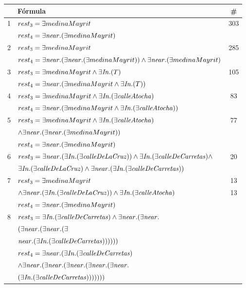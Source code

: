 \label{formulas-plurales}
\begin{table}[H]
\begin{center}
\begin{tabular}{|l|l|c|}
\hline
&F\'ormula			      &  \# \\ \hline \hline

1&$rest_3 = \exists medinaMayrit$ &303\\
 &$rest_4 = \exists \mathit{near}.(\exists medinaMayrit)$& \\ \hline

2&$rest_3 = \exists medinaMayrit$ & 285\\  
 &$rest_4 =  \exists \mathit{near}. (\exists \mathit{near}.(\exists medinaMayrit)) \land \exists \mathit{near}.(\exists medinaMayrit)$& \\ \hline

3&$rest_3 =\exists medinaMayrit \land \exists \mathit{In}.(T)$ & 105\\ 
 &$rest_4 =\exists \mathit{near}.(\exists medinaMayrit \land \exists \mathit{In}.(T))$& \\ \hline

4&$rest_3 =\exists medinaMayrit \land \exists \mathit{In}.(\exists \mathit{calleAtocha})$ &83 \\ 
 &$rest_4 =\exists \mathit{near}.(\exists medinaMayrit  \land \exists \mathit{In}.(\exists \mathit{calleAtocha}))$& \\ \hline

5&$rest_3 =\exists medinaMayrit  \land \exists \mathit{In}.(\exists \mathit{calleAtocha})$&77 \\ 
 &$\land \exists \mathit{near}.(\exists \mathit{near}.(\exists medinaMayrit))$& \\
&$rest_4 = \exists \mathit{near}.(\exists medinaMayrit)$& \\ \hline

6&$rest_3 =\exists \mathit{near}.(\exists \mathit{In}.(\exists \mathit{calleDeLaCruz}))  \land \exists \mathit{In}.(\exists \mathit{calleDeCarretas}) \land $ & 20\\
&$\exists \mathit{In}.(\exists \mathit{calleDeLaCruz})  \land \exists \mathit{near}.(\exists \mathit{In}.(\exists \mathit{calleDeCarretas}))$& \\ \hline

7&$rest_3 =\exists medinaMayrit  $&13 \\ 
&$\land \exists \mathit{near}.(\exists \mathit{In}.(\exists \mathit{calleDeLaCruz}))  \land \exists \mathit{In}.(\exists \mathit{calleAtocha})$ & 13\\
&$rest_4 = \exists \mathit{near}.(\exists medinaMayrit)$&\\ \hline

8&$rest_3 =\exists \mathit{In}.(\exists \mathit{calleDeCarretas})  \land \exists \mathit{near}.(\exists \mathit{near}.$&\\
&$(\exists \mathit{near}.(\exists \mathit{near}.(\exists$ &\\
&$\mathit{near}.(\exists \mathit{In}.(\exists \mathit{calleDeCarretas})))))) $&\\
&$rest_4 = \exists \mathit{near}.(\exists \mathit{In}.(\exists \mathit{calleDeCarretas})  $ & \\
&$\land \exists \mathit{near}.(\exists \mathit{near}.(\exists \mathit{near}.(\exists \mathit{near}.(\exists \mathit{near}.$&\\
&$(\exists \mathit{In}.(\exists \mathit{calleDeCarretas})))))))$&\\ \hline


\end{tabular}
\end{center}
\end{table}
